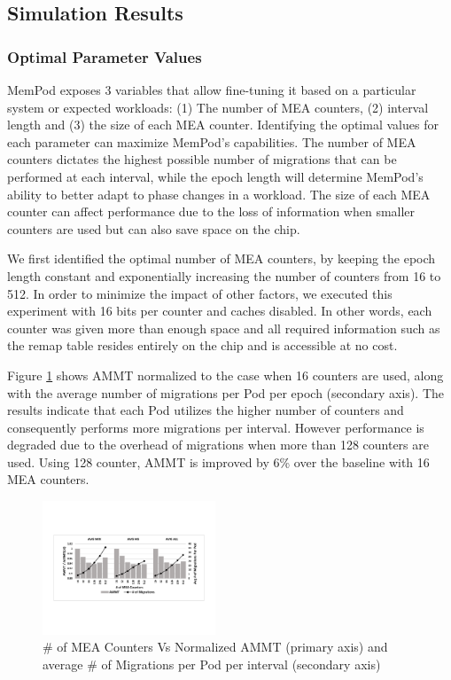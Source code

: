\subsection{Simulation Results}
\label{sub:SimResults}

\subsubsection{Optimal Parameter Values}

MemPod exposes 3 variables that allow fine-tuning it based on a particular system or expected workloads: (1) The number of MEA counters, (2) interval length and (3) the size of each MEA counter. Identifying the optimal values for each parameter can maximize MemPod's capabilities. The number of MEA counters dictates the highest possible number of migrations that can be performed at each interval, while the epoch length will determine MemPod's ability to better adapt to phase changes in a workload. The size of each MEA counter can affect performance due to the loss of information when smaller counters are used but can also save space on the chip.

We first identified the optimal number of MEA counters, by keeping the epoch length constant and exponentially increasing the number of counters from 16 to 512. In order to minimize the impact of other factors, we executed this experiment with 16 bits per counter and caches disabled. In other words, each counter was given more than enough space and all required information such as the remap table resides entirely on the chip and is accessible at no cost. 

Figure \ref{fig:num_counters} shows AMMT normalized to the case when 16 counters are used, along with the average number of migrations per Pod per epoch (secondary axis). The results indicate that each Pod utilizes the higher number of counters and consequently performs more migrations per interval. However performance is degraded due to the overhead of migrations when more than 128 counters are used. Using 128 counter, AMMT is improved by 6\% over the baseline with 16 MEA counters. 

\begin{figure}[h]
	\centering
  \includegraphics[width=0.46\textwidth]{figures/avg_num_counters_normalized.pdf}
  \caption{\# of MEA Counters Vs Normalized AMMT (primary axis) and average \# of Migrations per Pod per interval (secondary axis)}
  \label{fig:num_counters}
\end{figure}

